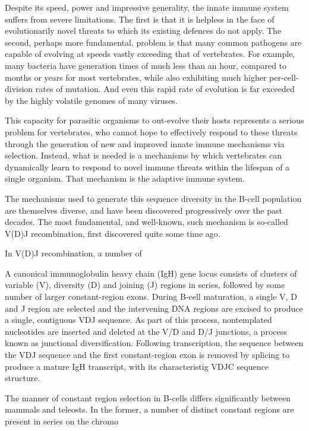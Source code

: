 Despite its speed, power and impressive generality, the innate immune system suffers from severe limitations. The first is that it is helpless in the face of evolutionarily novel threats to which its existing defences do not apply. The second, perhaps more fundamental, problem is that many common pathogens are capable of evolving at speeds vastly exceeding that of vertebrates. For example, many bacteria have generation times of much less than an hour, compared to months or years for most vertebrates, while also exhibiting much higher per-cell-division rates of mutation. And even this rapid rate of evolution is far exceeded by the highly volatile genomes of many viruses.

This capacity for parasitic organisms to out-evolve their hosts represents a serious problem for vertebrates, who cannot hope to effectively respond to these threats through the generation of new and improved innate immune mechanisms via selection. Instead, what is needed is a mechanisms by which vertebrates can dynamically learn to respond to novel immune threats within the lifespan of a single organism. That mechanism is the adaptive immune system.


The mechanisms used to generate this sequence diversity in the B-cell population are themselves diverse, and have been discovered progressively over the past decades. The most fundamental, and well-known, such mechanism is so-called V(D)J recombination, first discovered quite some time ago. %

In V(D)J recombination, a number of

A canonical immunoglobulin heavy chain (IgH) gene locus consists of clusters of variable (V), diversity (D) and joining (J) regions in series, followed by some number of larger constant-region exons. During B-cell maturation, a single V, D and J region are selected and the intervening DNA regions are excised to produce a single, contiguous VDJ sequence. As part of this process, nontemplated nucleotides are inserted and deleted at the V/D and D/J junctions, a process known as junctional diversification. Following transcription, the sequence between the VDJ sequence and the first constant-region exon is removed by splicing to produce a mature IgH transcript, with its characteristig VDJC sequence structure.

The manner of constant region selection in B-cells differs significantly between mammals and teleosts. In the former, a number of distinct constant regions are present in series on the chromo


